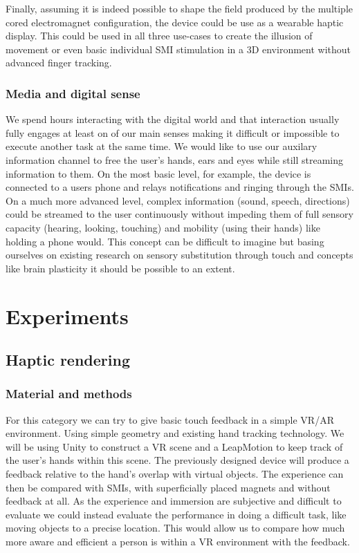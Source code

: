 \documentclass[10pt,journal,compsoc]{IEEEtran}
\begin{document}
		Finally, assuming it is indeed possible to shape the field produced by the multiple cored electromagnet configuration, the device could be use as a wearable haptic display. This could be used in all three use-cases to create the illusion of movement or even basic individual SMI stimulation in a 3D environment without advanced finger tracking.
		
		\subsubsection{Media and digital sense}
		We spend hours interacting with the digital world and that interaction usually fully engages at least on of our main senses making it difficult or impossible to execute another task at the same time. We would like to use our auxilary information channel to free the user's hands, ears and eyes while still streaming information to them.
		On the most basic level, for example, the device is connected to a users phone and relays notifications and ringing through the SMIs. On a much more advanced level, complex information (sound, speech, directions) could be streamed to the user continuously without impeding them of full sensory capacity (hearing, looking, touching) and mobility (using their hands) like holding a phone would.
		This concept can be difficult to imagine but basing ourselves on existing research on sensory substitution through touch and concepts like brain plasticity it should be possible to an extent.
\section{Experiments}
	\subsection{Haptic rendering}
		
		\subsubsection {Material and methods}
		For this category we can try to give basic touch feedback in a simple VR/AR environment. Using simple geometry and existing hand tracking technology.
		We will be using Unity to construct a VR scene and a LeapMotion to keep track of the user's hands within this scene. The previously designed device will produce a feedback relative to the hand's overlap with virtual objects. 
		The experience can then be compared with SMIs, with superficially placed magnets and without feedback at all. 
		As the experience and immersion are subjective and difficult to evaluate we could instead evaluate the performance in doing a difficult task, like moving objects to a precise location. This would allow us to compare how much more aware and efficient a person is within a VR environment with the feedback.
\end{document}
